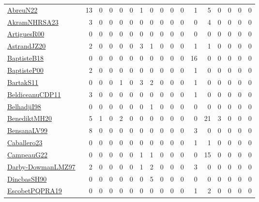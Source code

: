 {\begin{longtable}{l*{16}{r}}
\href{articles/AbreuN22.pdf}{AbreuN22}~\cite{AbreuN22} & 13 & 0 & 0 & 0 & 0 & 1 & 0 & 0 & 0 & 0 & 1 & 5 & 0 & 0 & 0 & 0\\
\href{articles/AkramNHRSA23.pdf}{AkramNHRSA23}~\cite{AkramNHRSA23} & 3 & 0 & 0 & 0 & 0 & 0 & 0 & 0 & 0 & 0 & 0 & 4 & 0 & 0 & 0 & 0\\
\href{articles/ArtiguesR00.pdf}{ArtiguesR00}~\cite{ArtiguesR00} & 0 & 0 & 0 & 0 & 0 & 0 & 0 & 0 & 0 & 0 & 0 & 0 & 0 & 0 & 0 & 0\\
\href{articles/AstrandJZ20.pdf}{AstrandJZ20}~\cite{AstrandJZ20} & 2 & 0 & 0 & 0 & 0 & 3 & 1 & 0 & 0 & 0 & 1 & 1 & 0 & 0 & 0 & 0\\
\href{articles/BaptisteB18.pdf}{BaptisteB18}~\cite{BaptisteB18} & 0 & 0 & 0 & 0 & 0 & 0 & 0 & 0 & 0 & 0 & 16 & 0 & 0 & 0 & 0 & 0\\
\href{articles/BaptisteP00.pdf}{BaptisteP00}~\cite{BaptisteP00} & 2 & 0 & 0 & 0 & 0 & 0 & 0 & 0 & 0 & 0 & 1 & 0 & 0 & 0 & 0 & 0\\
\href{articles/BartakS11.pdf}{BartakS11}~\cite{BartakS11} & 0 & 0 & 0 & 1 & 0 & 3 & 2 & 0 & 0 & 0 & 1 & 0 & 0 & 0 & 0 & 0\\
\href{articles/BeldiceanuCDP11.pdf}{BeldiceanuCDP11}~\cite{BeldiceanuCDP11} & 3 & 0 & 0 & 0 & 0 & 0 & 0 & 0 & 0 & 0 & 1 & 0 & 0 & 0 & 0 & 0\\
\href{articles/BelhadjiI98.pdf}{BelhadjiI98}~\cite{BelhadjiI98} & 0 & 0 & 0 & 0 & 0 & 0 & 1 & 0 & 0 & 0 & 0 & 0 & 0 & 0 & 0 & 0\\
\href{articles/BenediktMH20.pdf}{BenediktMH20}~\cite{BenediktMH20} & 5 & 1 & 0 & 2 & 0 & 0 & 0 & 0 & 0 & 0 & 0 & 21 & 3 & 0 & 0 & 0\\
\href{articles/BensanaLV99.pdf}{BensanaLV99}~\cite{BensanaLV99} & 8 & 0 & 0 & 0 & 0 & 0 & 0 & 0 & 0 & 0 & 3 & 0 & 0 & 0 & 0 & 0\\
\href{articles/Caballero23.pdf}{Caballero23}~\cite{Caballero23} & 0 & 0 & 0 & 0 & 0 & 0 & 0 & 0 & 0 & 0 & 1 & 1 & 0 & 0 & 0 & 0\\
\href{articles/CampeauG22.pdf}{CampeauG22}~\cite{CampeauG22} & 0 & 0 & 0 & 0 & 0 & 1 & 1 & 0 & 0 & 0 & 0 & 15 & 0 & 0 & 0 & 0\\
\href{articles/Darby-DowmanLMZ97.pdf}{Darby-DowmanLMZ97}~\cite{Darby-DowmanLMZ97} & 2 & 0 & 0 & 0 & 0 & 1 & 2 & 0 & 0 & 0 & 3 & 0 & 0 & 0 & 0 & 0\\
\href{articles/DincbasSH90.pdf}{DincbasSH90}~\cite{DincbasSH90} & 0 & 0 & 0 & 0 & 0 & 0 & 5 & 0 & 0 & 0 & 0 & 0 & 0 & 0 & 0 & 0\\
\href{articles/EscobetPQPRA19.pdf}{EscobetPQPRA19}~\cite{EscobetPQPRA19} & 0 & 0 & 0 & 0 & 0 & 0 & 0 & 0 & 0 & 0 & 1 & 2 & 0 & 0 & 0 & 0\\

\end{longtable}}
